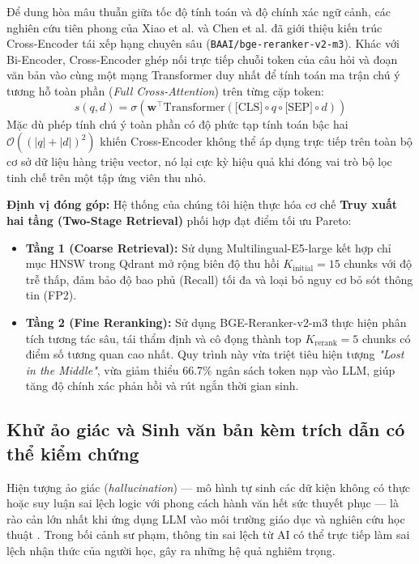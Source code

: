 ﻿\documentclass[12pt]{article}
\begin{document}
Để dung hòa mâu thuẫn giữa tốc độ tính toán và độ chính xác ngữ cảnh, các nghiên cứu tiên phong của Xiao et al. \cite{xiao2023c} và Chen et al. \cite{chen2024bge_m3} đã giới thiệu kiến trúc Cross-Encoder tái xếp hạng chuyên sâu (\texttt{BAAI/bge-reranker-v2-m3}). Khác với Bi-Encoder, Cross-Encoder ghép nối trực tiếp chuỗi token của câu hỏi và đoạn văn bản vào cùng một mạng Transformer duy nhất để tính toán ma trận chú ý tương hỗ toàn phần (\textit{Full Cross-Attention}) trên từng cặp token:
\begin{equation}
    s(q, d) = \sigma\left(\mathbf{w}^\top \text{Transformer}(\text{[CLS]} \circ q \circ \text{[SEP]} \circ d)\right)
\end{equation}
Mặc dù phép tính chú ý toàn phần có độ phức tạp tính toán bậc hai $\mathcal{O}((|q| + |d|)^2)$ khiến Cross-Encoder không thể áp dụng trực tiếp trên toàn bộ cơ sở dữ liệu hàng triệu vector, nó lại cực kỳ hiệu quả khi đóng vai trò bộ lọc tinh chế trên một tập ứng viên thu nhỏ.

\noindent \textbf{Định vị đóng góp:} Hệ thống của chúng tôi hiện thực hóa cơ chế \textbf{Truy xuất hai tầng (Two-Stage Retrieval)} phối hợp đạt điểm tối ưu Pareto:
\begin{itemize}
    \item \textbf{Tầng 1 (Coarse Retrieval):} Sử dụng Multilingual-E5-large kết hợp chỉ mục HNSW trong Qdrant mở rộng biên độ thu hồi $K_{\text{initial}} = 15$ chunks với độ trễ thấp, đảm bảo độ bao phủ (Recall) tối đa và loại bỏ nguy cơ bỏ sót thông tin (FP2).
    \item \textbf{Tầng 2 (Fine Reranking):} Sử dụng BGE-Reranker-v2-m3 thực hiện phân tích tương tác sâu, tái thẩm định và cô đọng thành top $K_{\text{rerank}} = 5$ chunks có điểm số tương quan cao nhất. Quy trình này vừa triệt tiêu hiện tượng \textit{"Lost in the Middle"}, vừa giảm thiểu 66.7\% ngân sách token nạp vào LLM, giúp tăng độ chính xác phản hồi và rút ngắn thời gian sinh.
\end{itemize}

\subsection{Khử ảo giác và Sinh văn bản kèm trích dẫn có thể kiểm chứng}
Hiện tượng ảo giác (\textit{hallucination}) --- mô hình tự sinh các dữ kiện không có thực hoặc suy luận sai lệch logic với phong cách hành văn hết sức thuyết phục --- là rào cản lớn nhất khi ứng dụng LLM vào môi trường giáo dục và nghiên cứu học thuật \cite{ji2023survey}. Trong bối cảnh sư phạm, thông tin sai lệch từ AI có thể trực tiếp làm sai lệch nhận thức của người học, gây ra những hệ quả nghiêm trọng.
\end{document}
